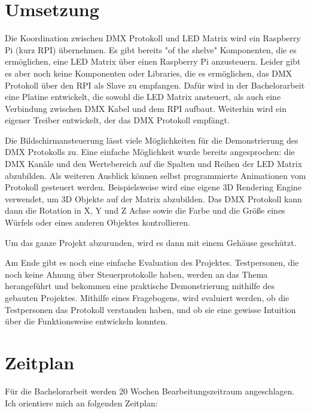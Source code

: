 \section{Umsetzung}
Die Koordination zwischen DMX Protokoll und LED Matrix wird ein Raspberry Pi (kurz RPI) übernehmen. Es gibt bereits "of the shelve" Komponenten, die es ermöglichen, eine LED Matrix über einen Raspberry Pi anzusteuern. Leider gibt es aber noch keine Komponenten oder Libraries, die es ermöglichen, das DMX Protokoll über den RPI als Slave zu empfangen. Dafür wird in der Bachelorarbeit eine Platine entwickelt, die sowohl die LED Matrix ansteuert, als auch eine Verbindung zwischen DMX Kabel und dem RPI aufbaut. Weiterhin wird ein eigener Treiber entwickelt, der das DMX Protokoll empfängt.

Die Bildschirmansteuerung lässt viele Möglichkeiten für die Demonstrierung des DMX Protokolls zu. Eine einfache Möglichkeit wurde bereits angesprochen: die DMX Kanäle und den Wertebereich auf die Spalten und Reihen der LED Matrix abzubilden. Als weiteren Ausblick können selbst programmierte Animationen vom Protokoll gesteuert werden. Beispielsweise wird eine eigene 3D Rendering Engine verwendet, um 3D Objekte auf der Matrix abzubilden. Das DMX Protokoll kann dann die Rotation in X, Y und Z Achse sowie die Farbe und die Größe eines Würfels oder eines anderen Objektes kontrollieren.

Um das ganze Projekt abzurunden, wird es dann mit einem Gehäuse geschützt.

Am Ende gibt es noch eine einfache Evaluation des Projektes. Testpersonen, die noch keine Ahnung über Steuerprotokolle haben, werden an das Thema herangeführt und bekommen eine praktische Demonstrierung mithilfe des gebauten Projektes. Mithilfe eines Fragebogens, wird evaluiert werden, ob die Testpersonen das Protokoll verstanden haben, und ob sie eine gewisse Intuition über die Funktionsweise entwickeln konnten.

\section{Zeitplan}
Für die Bachelorarbeit werden 20 Wochen Bearbeitungszeitraum angeschlagen. Ich orientiere mich an folgenden Zeitplan:


